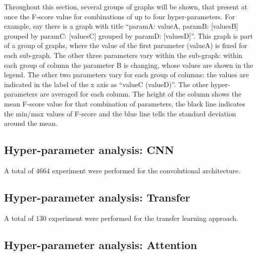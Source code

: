 Throughout this section, several groups of graphs will be shown, that present
at once the F-score value for combinations of up to four hyper-parameters.
For example, say there is a graph 
with title 
``paramA: valueA, paramB: [valuesB]
grouped by paramC: [valuesC]
grouped by paramD: [valuesD]''.
This graph is part of a group of graphs, where the value of the first parameter
(valueA) is fixed for each sub-graph.
The other three parameters vary within the sub-graph:
within each group of column the parameter B is changing,
whose values are shown in the legend.
The other two parameters vary for each group of columns:
the values are indicated in the label of the x axis as ``valueC (valueD)''.
The other hyper-parameters are averaged for each column.
The height of the column shows the mean F-score value for that
combination of parameters,
the black line indicates the min/max values of F-score and the
blue line tells the standard deviation around the mean.

\subsection{Hyper-parameter analysis: CNN}


A total of $4664$ experiment were performed for the convolutional architecture.

\subsection{Hyper-parameter analysis: Transfer}

A total of $130$ experiment were performed for the transfer learning approach.

\subsection{Hyper-parameter analysis: Attention}

